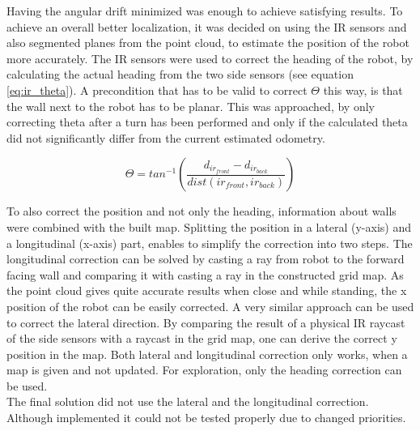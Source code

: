 Having the angular drift minimized was enough to achieve satisfying results.
To achieve an overall better localization, it was decided on using the IR sensors and also segmented planes from the point cloud, to estimate the position of the robot more accurately.
The IR sensors were used to correct the heading of the robot, by calculating the actual heading from the two side sensors (see equation \ref{eq:ir_theta}).
A precondition that has to be valid to correct $\Theta$ this way, is that the wall next to the robot has to be planar.
This was approached, by only correcting theta after a turn has been performed and only if the calculated theta did not significantly differ from the current estimated odometry.

\begin{equation}
\Theta = tan^{-1}\left( \frac{ d_{ir_{front}} - d_{ir_{back}} }{dist(ir_{front}, ir_{back})} \right)
\label{eq:ir_theta}
\end{equation}

To also correct the position and not only the heading, information about walls were combined with the built map.
Splitting the position in a lateral (y-axis) and a longitudinal (x-axis) part, enables to simplify the correction into two steps.
The longitudinal correction can be solved by casting a ray from robot to the forward facing wall and comparing it with casting a ray in the constructed grid map.
As the point cloud gives quite accurate results when close and while standing, the x position of the robot can be easily corrected.
A very similar approach can be used to correct the lateral direction. 
By comparing the result of a physical IR raycast of the side sensors with a raycast in the grid map, one can derive the correct y position in the map.
Both lateral and longitudinal correction only works, when a map is given and not updated.
For exploration, only the heading correction can be used.\\

The final solution did not use the lateral and the longitudinal correction.
Although implemented it could not be tested properly due to changed priorities.